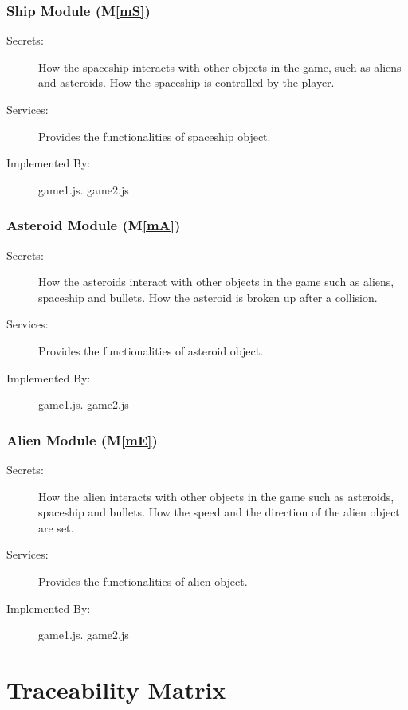 \documentclass[12pt, titlepage]{article}
\newcommand{\mref}[1]{M\ref{#1}}
\begin{document}
\subsubsection{Ship Module  (\mref{mS})}

\begin{description}
\item[Secrets:]How the spaceship interacts with other objects in the game, such as aliens and asteroids. How the spaceship is controlled by the player. 
\item[Services:]Provides the functionalities of spaceship object.
\item[Implemented By:] game1.js. game2.js
\end{description}

\subsubsection{Asteroid Module  (\mref{mA})}

\begin{description}
\item[Secrets:]How the asteroids interact with other objects in the game such as aliens, spaceship and bullets. How the asteroid is broken up after a collision.
\item[Services:]Provides the functionalities of asteroid object.
\item[Implemented By:] game1.js. game2.js
\end{description}

\subsubsection{Alien Module  (\mref{mE})}

\begin{description}
\item[Secrets:]How the alien interacts with other objects in the game such as asteroids, spaceship and bullets. How the speed and the direction of the alien object are set.
\item[Services:]Provides the functionalities of alien object.
\item[Implemented By:] game1.js. game2.js
\end{description}

\section{Traceability Matrix} \label{SecTM}
\end{document}
